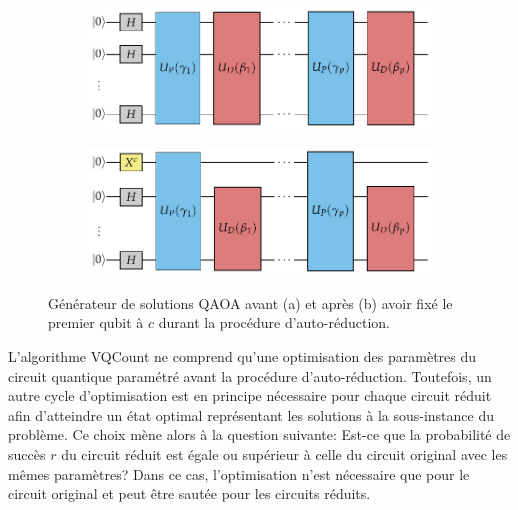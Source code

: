 \begin{figure}[h!]
    \centering
    \begin{subfigure}[h]{0.6\textwidth}
    \centering
    \caption{}
    \includegraphics[width=1\textwidth]{figures/qaoa-self-reducibility-1.pdf}
    \label{fig:vqcount-circuit-a}
    \end{subfigure}
    \begin{subfigure}[h]{0.6\textwidth}
    \centering
    \caption{}
    \includegraphics[width=1\textwidth]{figures/qaoa-self-reducibility-2.pdf}
    \label{fig:vqcount-circuit-b}
    \end{subfigure}
\caption[Procédure d'auto-réduction de VQCount]{Générateur de solutions QAOA avant (a) et après (b) avoir fixé le premier qubit à $c$ durant la procédure d'auto-réduction.}
\label{fig:vqcount-circuit}
\end{figure}

L'algorithme VQCount ne comprend qu'une optimisation des paramètres du circuit quantique paramétré avant la procédure d'auto-réduction. Toutefois, un autre cycle d'optimisation est en principe nécessaire pour chaque circuit réduit afin d'atteindre un état optimal représentant les solutions à la sous-instance du problème. Ce choix mène alors à la question suivante: Est-ce que la probabilité de succès $r$ du circuit réduit est égale ou supérieur à celle du circuit original avec les mêmes paramètres? Dans ce cas, l'optimisation n'est nécessaire que pour le circuit original et peut être sautée pour les circuits réduits.

